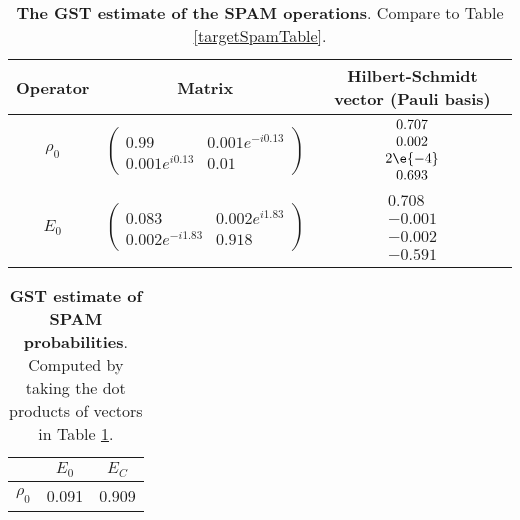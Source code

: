 {\begin{table}[h]
\begin{center}
\begin{tabular}[l]{|c|c|c|}
\hline
Operator & Matrix & Hilbert-Schmidt vector (Pauli basis) \\ \hline
$\rho_{0}$ & $ \left(\!\!\begin{array}{cc}
0.99 & 0.001e^{-i0.13} \\ 
0.001e^{i0.13} & 0.01
 \end{array}\!\!\right) $
 & $ \begin{array}{c}
0.707 \\ 
0.002 \\ 
2\e{-4} \\ 
0.693
 \end{array} $
 \\ \hline
$E_{0}$ & $ \left(\!\!\begin{array}{cc}
0.083 & 0.002e^{i1.83} \\ 
0.002e^{-i1.83} & 0.918
 \end{array}\!\!\right) $
 & $ \begin{array}{c}
0.708 \\ 
-0.001 \\ 
-0.002 \\ 
-0.591
 \end{array} $
 \\ \hline
\end{tabular}

\caption{\textbf{The GST estimate of the SPAM operations}.  Compare to Table \ref{targetSpamTable}.\label{bestCPTPGatesetSpamTable}}
\end{center}
\end{table}

\begin{table}[h]
\begin{center}
\begin{tabular}[l]{|c|c|c|}
\hline
 & $E_{0}$ & $E_C$ \\ \hline
$\rho_{0}$ & 0.091 & 0.909 \\ \hline
\end{tabular}

\caption{\textbf{GST estimate of SPAM probabilities}.  Computed by taking the dot products of vectors in Table \ref{bestCPTPGatesetSpamTable}.\label{bestCPTPGatesetSpamParametersTable}}
\end{center}
\end{table}

}
